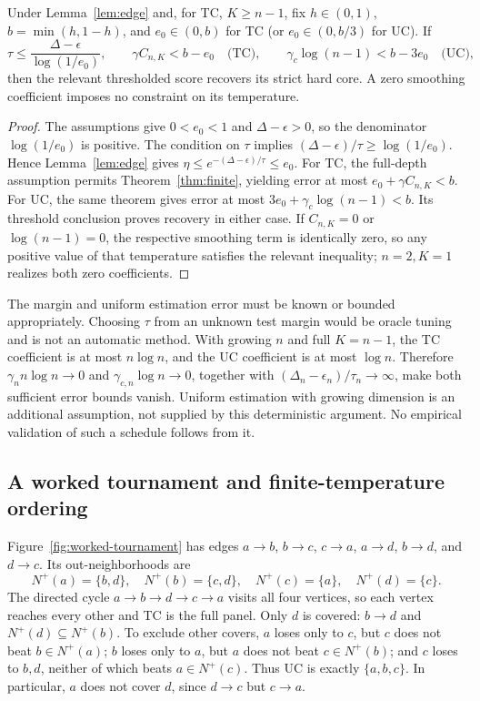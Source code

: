 \begin{corollary}\label{cor:temperature-budget}
Under Lemma~\ref{lem:edge} and, for TC, $K\ge n-1$, fix $h\in(0,1)$, $b=\min(h,1-h)$, and $e_0\in(0,b)$ for TC (or $e_0\in(0,b/3)$ for UC). If
\[
\tau\le\frac{\Delta-\epsilon}{\log(1/e_0)},\qquad
\gamma C_{n,K}<b-e_0\quad\text{(TC)},\qquad
\gamma_c\log(n-1)<b-3e_0\quad\text{(UC)},
\]
then the relevant thresholded score recovers its strict hard core. A zero smoothing coefficient imposes no constraint on its temperature.
\end{corollary}
\begin{proof}
The assumptions give $0<e_0<1$ and $\Delta-\epsilon>0$, so the denominator $\log(1/e_0)$ is positive. The condition on $\tau$ implies $(\Delta-\epsilon)/\tau\ge\log(1/e_0)$. Hence Lemma~\ref{lem:edge} gives $\eta\le e^{-(\Delta-\epsilon)/\tau}\le e_0$. For TC, the full-depth assumption permits Theorem~\ref{thm:finite}, yielding error at most $e_0+\gamma C_{n,K}<b$. For UC, the same theorem gives error at most $3e_0+\gamma_c\log(n-1)<b$. Its threshold conclusion proves recovery in either case. If $C_{n,K}=0$ or $\log(n-1)=0$, the respective smoothing term is identically zero, so any positive value of that temperature satisfies the relevant inequality; $n=2,K=1$ realizes both zero coefficients.
\end{proof}
The margin and uniform estimation error must be known or bounded appropriately. Choosing $\tau$ from an unknown test margin would be oracle tuning and is not an automatic method. With growing $n$ and full $K=n-1$, the TC coefficient is at most $n\log n$, and the UC coefficient is at most $\log n$. Therefore $\gamma_n n\log n\to0$ and $\gamma_{c,n}\log n\to0$, together with $(\Delta_n-\epsilon_n)/\tau_n\to\infty$, make both sufficient error bounds vanish. Uniform estimation with growing dimension is an additional assumption, not supplied by this deterministic argument. No empirical validation of such a schedule follows from it.

\subsection{A worked tournament and finite-temperature ordering}
Figure~\ref{fig:worked-tournament} has edges $a\to b$, $b\to c$, $c\to a$, $a\to d$, $b\to d$, and $d\to c$. Its out-neighborhoods are
\[
N^+(a)=\{b,d\},\quad N^+(b)=\{c,d\},\quad
N^+(c)=\{a\},\quad N^+(d)=\{c\}.
\]
The directed cycle $a\to b\to d\to c\to a$ visits all four vertices, so each vertex reaches every other and TC is the full panel. Only $d$ is covered: $b\to d$ and $N^+(d)\subseteq N^+(b)$. To exclude other covers, $a$ loses only to $c$, but $c$ does not beat $b\in N^+(a)$; $b$ loses only to $a$, but $a$ does not beat $c\in N^+(b)$; and $c$ loses to $b,d$, neither of which beats $a\in N^+(c)$. Thus UC is exactly $\{a,b,c\}$. In particular, $a$ does not cover $d$, since $d\to c$ but $c\to a$.

